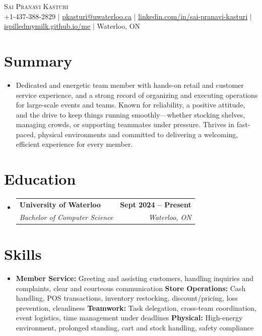 \documentclass[letterpaper,10.5pt]{article}
\makeatletter
\newcommand{\resumeSubheading}[4]{
  \vspace{-1pt}\item
    \begin{tabular*}{1.0\textwidth}[t]{l@{\extracolsep{\fill}}r}
      \textbf{#1} & \textbf{\small #2} \\
      \textit{\small#3} & \textit{\small #4} \\[-2pt]
    \end{tabular*}\vspace{-5pt}
}
\newcommand{\resumeSubHeadingListStart}{\begin{itemize}[leftmargin=0.0in, label={}]}
\newcommand{\resumeSubHeadingListEnd}{\end{itemize}}
\makeatother
\begin{document}
\vspace{-16pt}
\begin{center}
    {\Huge \scshape Sai Pranavi Kasturi} \\
    \vspace{4pt}
    \small +1-437-388-2829 $|$ \underline{pkasturi@uwaterloo.ca} $|$
    \href{https://linkedin.com/in/sai-pranavi-kasturi-704807298}{\underline{linkedin.com/in/sai-pranavi-kasturi}} $|$
    \href{https://ispilledmymilk.github.io/me/}{\underline{ispilledmymilk.github.io/me}} $|$
    Waterloo, ON
\end{center}
\vspace{2pt}

\section{Summary}
\begin{itemize}[leftmargin=0.05in, label={}]
  \small\item{
    Dedicated and energetic team member with hands-on retail and customer service experience, and a strong record of organizing and executing operations for large-scale events and teams. Known for reliability, a positive attitude, and the drive to keep things running smoothly---whether stocking shelves, managing crowds, or supporting teammates under pressure. Thrives in fast-paced, physical environments and committed to delivering a welcoming, efficient experience for every member.
  }
\end{itemize}
\vspace{-4pt}

\section{Education}
  \resumeSubHeadingListStart
    \resumeSubheading
      {University of Waterloo}{Sept 2024 -- Present}
      {Bachelor of Computer Science}{Waterloo, ON}
  \resumeSubHeadingListEnd
\vspace{-4pt}

\section{Skills}
\begin{itemize}[leftmargin=0.05in, label={}]
  \small\item{
    \textbf{Member Service:} Greeting and assisting customers, handling inquiries and complaints, clear and courteous communication \quad
    \textbf{Store Operations:} Cash handling, POS transactions, inventory restocking, discount/pricing, loss prevention, cleanliness \quad
    \textbf{Teamwork:} Task delegation, cross-team coordination, event logistics, time management under deadlines \quad
    \textbf{Physical:} High-energy environment, prolonged standing, cart and stock handling, safety compliance
  }
\end{itemize}
\vspace{-4pt}
\end{document}

